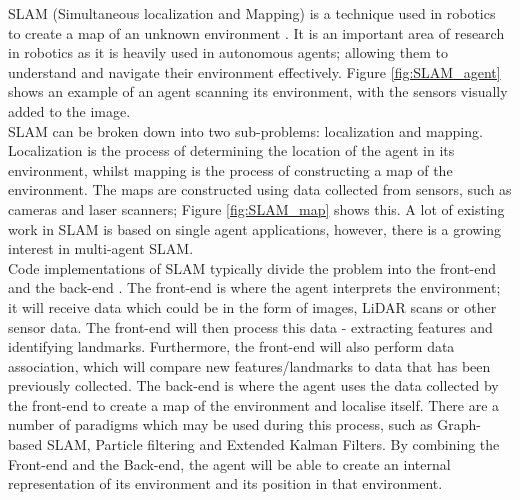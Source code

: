 \documentclass[12pt]{article}
\begin{document}
SLAM (Simultaneous localization and Mapping) is a technique used in robotics to create a map of an unknown environment \cite{SLAM_overview}.
It is an important area of research in robotics as it is heavily used in autonomous agents; allowing them to understand and navigate their environment
effectively. Figure \ref{fig:SLAM_agent} shows an example of an agent scanning its environment, with the sensors visually added to the image.\\
SLAM can be broken down into two sub-problems: localization and mapping. Localization is the process of determining the
location of the agent in its environment, whilst mapping is the process of constructing a map of the environment. The maps
are constructed using data collected from sensors, such as cameras and laser scanners; Figure \ref{fig:SLAM_map} shows this.
A lot of existing work in SLAM is based on single agent applications, however, there is a growing interest in multi-agent
SLAM.\\
Code implementations of SLAM typically divide the problem into the front-end and the back-end \cite{SLAM_components}.
The front-end is where the agent interprets the environment; it will receive data which could be in the form of images,
LiDAR scans or other sensor data. The front-end will then process this data - extracting features and identifying landmarks.
Furthermore, the front-end will also perform data association, which will compare new features/landmarks to data that has
been previously collected. The back-end is where the agent uses the data collected by the front-end to create a map
of the environment and localise itself. There are a number of paradigms which may be used during this process, such as Graph-based
SLAM, Particle filtering and Extended Kalman Filters. By combining the Front-end and the Back-end, the agent will be able to
create an internal representation of its environment and its position in that environment.
\end{document}
